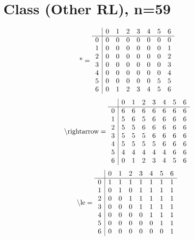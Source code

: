 \documentclass[11pt]{article}
\begin{document}
\section{Class (Other RL), n=59}
\[\text{*} = 
\begin{array}{r | r r r r r r r}
 & 0 & 1 & 2 & 3 & 4 & 5 & 6 \\ \hline
0 & 0 & 0 & 0 & 0 & 0 & 0 & 0 \\
1 & 0 & 0 & 0 & 0 & 0 & 0 & 1 \\
2 & 0 & 0 & 0 & 0 & 0 & 0 & 2 \\
3 & 0 & 0 & 0 & 0 & 0 & 0 & 3 \\
4 & 0 & 0 & 0 & 0 & 0 & 0 & 4 \\
5 & 0 & 0 & 0 & 0 & 0 & 5 & 5 \\
6 & 0 & 1 & 2 & 3 & 4 & 5 & 6 \\
\end{array}
\]
\[\text{\textbackslash rightarrow} = 
\begin{array}{r | r r r r r r r}
 & 0 & 1 & 2 & 3 & 4 & 5 & 6 \\ \hline
0 & 6 & 6 & 6 & 6 & 6 & 6 & 6 \\
1 & 5 & 6 & 5 & 6 & 6 & 6 & 6 \\
2 & 5 & 5 & 6 & 6 & 6 & 6 & 6 \\
3 & 5 & 5 & 5 & 6 & 6 & 6 & 6 \\
4 & 5 & 5 & 5 & 5 & 6 & 6 & 6 \\
5 & 4 & 4 & 4 & 4 & 4 & 6 & 6 \\
6 & 0 & 1 & 2 & 3 & 4 & 5 & 6 \\
\end{array}
\]
\[\text{\textbackslash le} = 
\begin{array}{r | r r r r r r r}
 & 0 & 1 & 2 & 3 & 4 & 5 & 6 \\ \hline
0 & 1 & 1 & 1 & 1 & 1 & 1 & 1 \\
1 & 0 & 1 & 0 & 1 & 1 & 1 & 1 \\
2 & 0 & 0 & 1 & 1 & 1 & 1 & 1 \\
3 & 0 & 0 & 0 & 1 & 1 & 1 & 1 \\
4 & 0 & 0 & 0 & 0 & 1 & 1 & 1 \\
5 & 0 & 0 & 0 & 0 & 0 & 1 & 1 \\
6 & 0 & 0 & 0 & 0 & 0 & 0 & 1 \\
\end{array}
\]
\end{document}
